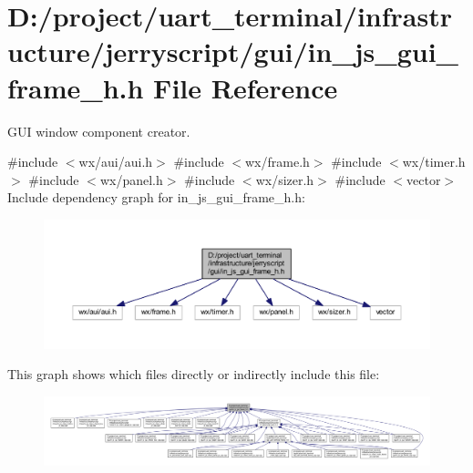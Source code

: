 \section{D\+:/project/uart\+\_\+terminal/infrastructure/jerryscript/gui/in\+\_\+js\+\_\+gui\+\_\+frame\+\_\+h.h File Reference}
\label{in__js__gui__frame__h_8h}


G\+UI window component creator.  


{\ttfamily \#include $<$wx/aui/aui.\+h$>$}\newline
{\ttfamily \#include $<$wx/frame.\+h$>$}\newline
{\ttfamily \#include $<$wx/timer.\+h$>$}\newline
{\ttfamily \#include $<$wx/panel.\+h$>$}\newline
{\ttfamily \#include $<$wx/sizer.\+h$>$}\newline
{\ttfamily \#include $<$vector$>$}\newline
Include dependency graph for in\+\_\+js\+\_\+gui\+\_\+frame\+\_\+h.\+h\+:\nopagebreak
\begin{figure}[H]
\begin{center}
\leavevmode
\includegraphics[width=350pt]{in__js__gui__frame__h_8h__incl}
\end{center}
\end{figure}
This graph shows which files directly or indirectly include this file\+:\nopagebreak
\begin{figure}[H]
\begin{center}
\leavevmode
\includegraphics[width=350pt]{in__js__gui__frame__h_8h__dep__incl}
\end{center}
\end{figure}

